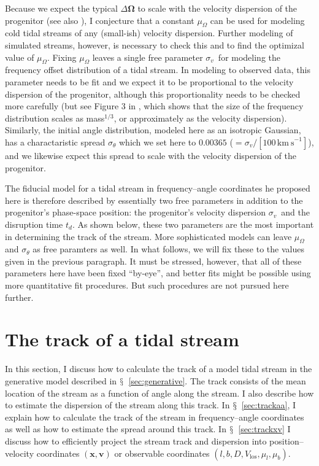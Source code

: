 \documentclass[12pt,preprint]{aastex}
\newcommand{\sectionname}{$\mathsection$}
\renewcommand{\vec}[1]{\ensuremath{\mathbf{#1}}}
\newcommand{\vecx}{\ensuremath{\vec{x}}}
\newcommand{\vecv}{\ensuremath{\vec{v}}}
\newcommand{\veco}{\ensuremath{\vec{\Omega}}}
\newcommand{\sigv}{\ensuremath{\sigma_v}}
\newcommand{\kms}{\ensuremath{\,\mathrm{km\ s}^{-1}}}
\newcommand{\vlos}{\ensuremath{V_{\mathrm{los}}}}
\newcommand{\pmll}{\ensuremath{\mu_l}}
\newcommand{\pmbb}{\ensuremath{\mu_b}}
\begin{document}
Because we expect the typical $\Delta\veco$ to scale with the
velocity dispersion of the progenitor (see also \citealt{Sanders13a}),
I conjecture that a constant $\mu_\Omega$ can be used for modeling
cold tidal streams of any (small-ish) velocity dispersion. Further
modeling of simulated streams, however, is necessary to check this and
to find the optimizal value of $\mu_\Omega$. Fixing $\mu_\Omega$
leaves a single free parameter \sigv\ for modeling the frequency
offset distribution of a tidal stream. In modeling to observed data,
this parameter needs to be fit and we expect it to be proportional to
the velocity dispersion of the progenitor, although this
proportionality needs to be checked more carefully (but see Figure 3
in \citealt{Sanders13a}, which shows that the size of the frequency
distribution scales as mass$^{1/3}$, or approximately as the velocity
dispersion). Similarly, the initial angle distribution, modeled here
as an isotropic Gaussian, has a charactaristic spread $\sigma_{\theta}$
which we set here to $0.00365$ ($=\sigv/[100\kms]$), and we likewise
expect this spread to scale with the velocity dispersion of the
progenitor.

The fiducial model for a tidal stream in frequency--angle coordinates
he proposed here is therefore described by essentially two free
parameters in addition to the progenitor's phase-space position: the
progenitor's velocity dispersion \sigv\ and the disruption time
$t_d$. As shown below, these two parameters are the most important in
determining the track of the stream. More sophisticated models can
leave $\mu_\Omega$ and $\sigma_{\theta}$ as free paramters as well. In
what follows, we will fix these to the values given in the previous
paragraph. It must be stressed, however, that all of these parameters
here have been fixed ``by-eye'', and better fits might be possible
using more quantitative fit procedures. But such procedures are not
pursued here further.


\section{The track of a tidal stream}\label{sec:track}

In this section, I discuss how to calculate the track of a model tidal
stream in the generative model described in
\sectionname~\ref{sec:generative}. The track consists of the mean
location of the stream as a function of angle along the stream. I also
describe how to estimate the dispersion of the stream along this
track. In \sectionname~\ref{sec:trackaa}, I explain how to calculate
the track of the stream in frequency--angle coordinates as well as how
to estimate the spread around this track. In
\sectionname~\ref{sec:trackxv} I discuss how to efficiently project
the stream track and dispersion into position--velocity coordinates
$(\vecx,\vecv)$ or observable coordinates $(l,b,D,\vlos,\pmll,\pmbb)$.
\end{document}
